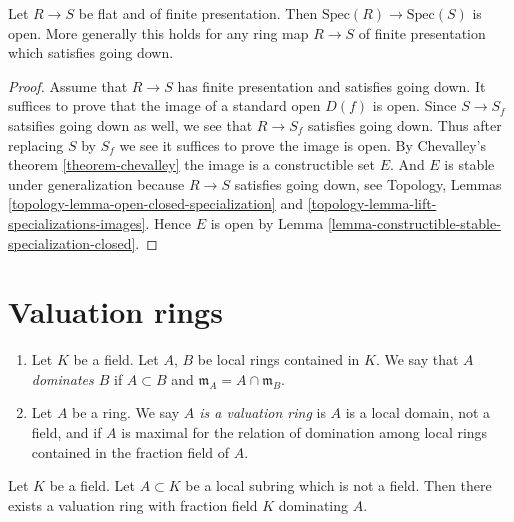 \begin{proposition}
\label{proposition-fppf-open}
Let $R \to S$ be flat and of finite presentation.
Then $\text{Spec}(R) \to \text{Spec}(S)$ is open.
More generally this holds for any ring map $R \to S$ of
finite presentation which satisfies going down.
\end{proposition}

\begin{proof}
Assume that $R \to S$ has finite presentation and satisfies
going down. 
It suffices to prove that the image of a standard open $D(f)$ is open.
Since $S \to S_f$ satsifies going down as well, we see that
$R \to S_f$ satisfies going down. Thus after replacing
$S$ by $S_f$ we see it suffices to prove the image is
open. By Chevalley's theorem \ref{theorem-chevalley}
the image is a constructible set $E$. And $E$ is stable
under generalization because $R \to S$ satisfies going down,
see Topology, Lemmas \ref{topology-lemma-open-closed-specialization}
and \ref{topology-lemma-lift-specializations-images}.
Hence $E$ is open by
Lemma \ref{lemma-constructible-stable-specialization-closed}.
\end{proof}















\section{Valuation rings}
\label{section-valuation-rings}

\begin{definition}
\label{definition-valuation-ring}
\begin{enumerate}
\item Let $K$ be a field. Let $A$, $B$ be local rings contained
in $K$. We say that {\it $A$ dominates $B$} if $A \subset B$
and $\mathfrak m_A = A \cap \mathfrak m_B$.
\item Let $A$ be a ring. We say {\it $A$ is a valuation ring}
is $A$ is a local domain, not a field, and if $A$ is maximal
for the relation of domination among local rings contained in
the fraction field of $A$.
\end{enumerate}
\end{definition}

\begin{lemma}
\label{lemma-dominate}
Let $K$ be a field.
Let $A \subset K$ be a local subring which is not a field.
Then there exists a valuation ring with fraction field $K$
dominating $A$.
\end{lemma}

